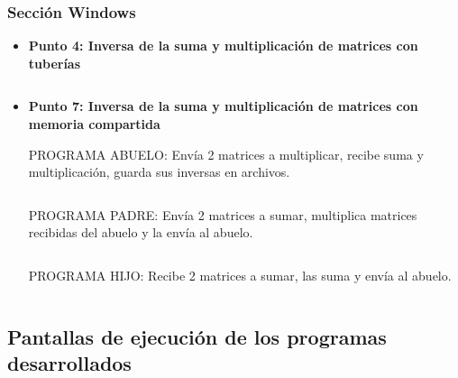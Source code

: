 \documentclass[12pt]{article}
\begin{document}
      \subsubsection{Sección Windows}
      \begin{itemize}
        \item [\Checkmark]\textbf{Punto 4: Inversa de la suma y multiplicación de matrices con tuberías}
          \inputminted{c++}{Code/Windows/4.c}
        
        \item[\Checkmark] \textbf{Punto 7: Inversa de la suma y multiplicación de matrices con memoria compartida}
        
            PROGRAMA ABUELO: Envía 2 matrices a multiplicar, recibe suma y multiplicación, guarda sus inversas en archivos.
            
            \inputminted{c++}{Code/Windows/7_1.c}
            
            PROGRAMA PADRE: Envía 2 matrices a sumar, multiplica matrices recibidas del abuelo y la envía al abuelo.
            
            \inputminted{c++}{Code/Windows/7_2.c}
            
            PROGRAMA HIJO: Recibe 2 matrices a sumar, las suma y envía al abuelo.
              \inputminted{c++}{Code/Windows/7_3.c}
      \end{itemize}
        
\newpage


    \subsection{Pantallas de ejecución de los programas desarrollados}
          
        
\end{document}
